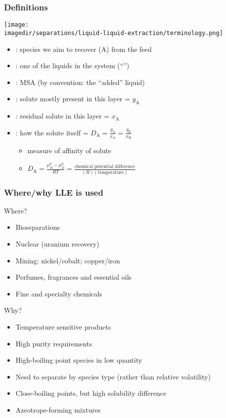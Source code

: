\begin{frame}\frametitle{Definitions}
	\begin{center}
		\texttt{[image: \\imagedir/separations/liquid-liquid-extraction/terminology.png]}
	\end{center}
	
	\begin{itemize}
		\item	{\color{purple}{solute}}: species we aim to recover (A) from the feed 
		\item	{\color{purple}{feed or ``feed solvent''}}: one of the liquids in the system {\tiny (``{\color{purple}{carrier}}'')}
		\item	{\color{purple}{solvent}}: MSA (by convention: the ``added'' liquid)
		\item	{\color{purple}{extract}}: solute mostly present in this layer = $y_\text{A}$
		\item	{\color{purple}{raffinate}}: residual solute in this layer = $x_\text{A}$
		\item	{\color{purple}{distribution}}: how the solute {\color{purple}{partitions}} itself = $D_\text{A} = \displaystyle \frac{y_\text{A}}{x_\text{A}} = \displaystyle \frac{y_\text{E}}{x_\text{R}}$
			\begin{itemize}
				\item	measure of affinity of solute
				\item	$D_\text{A} = \displaystyle \frac{\mu_R^0 - \mu_E^0}{RT} = \displaystyle \frac{\text{chemical potential difference}}{(R)(\text{temperature})}$	%
			\end{itemize}
	\end{itemize}	
\end{frame}

\begin{frame}\frametitle{Where/why LLE is used}
	Where?
	\begin{itemize}
		\item	Bioseparations
		\item	Nuclear (uranium recovery)
		\item	Mining: nickel/cobalt; copper/iron
		\item	Perfumes, fragrances and essential oils
		\item	Fine and specialty chemicals
	\end{itemize}
	Why?
	\begin{itemize}
		\item	Temperature sensitive products
		\item	High purity requirements
		\item	High-boiling point species in low quantity
		\item	Need to separate by species type (rather than relative volatility)
		\item	Close-boiling points, but high solubility difference
		\item	Azeotrope-forming mixtures
	\end{itemize}
\end{frame}

